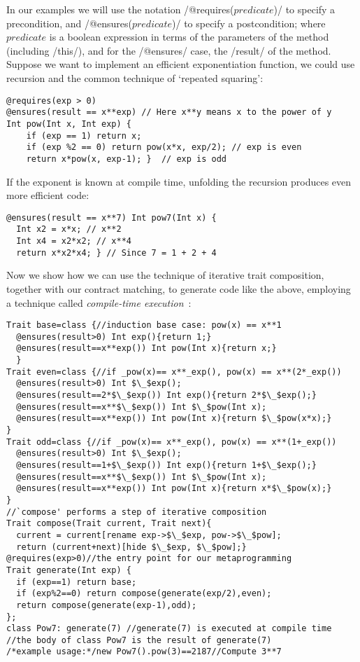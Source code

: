 In our examples we will use the notation /@requires($predicate$)/ 
to specify a precondition, and /@ensures($predicate$)/ 
to specify a postcondition; where $predicate$ is a boolean expression
in terms of the parameters of the method (including /this/), and for the /@ensures/ case, the /result/ of the method.
Suppose we want to implement an efficient exponentiation function, we could use recursion and the common technique of `repeated squaring':
\vspace{-1ex}
\begin{lstlisting}
@requires(exp > 0)
@ensures(result == x**exp) // Here x**y means x to the power of y
Int pow(Int x, Int exp) {
	if (exp == 1) return x;
	if (exp %2 == 0) return pow(x*x, exp/2); // exp is even
	return x*pow(x, exp-1); }  // exp is odd
\end{lstlisting}
If the exponent is known at compile time,
unfolding the recursion produces even more efficient code:
\vspace{-1ex}
\begin{lstlisting}[firstnumber=7]
@ensures(result == x**7) Int pow7(Int x) { 
  Int x2 = x*x; // x**2
  Int x4 = x2*x2; // x**4
  return x*x2*x4; } // Since 7 = 1 + 2 + 4
\end{lstlisting}
\vspace{-1ex}
Now we show how we can use the technique of iterative trait composition, together with our contract matching, to generate code like the above, employing a technique called \emph{compile-time execution}~\cite{sheard2002template}:
\vspace{-1ex}
\begin{lstlisting}[firstnumber=11]
Trait base=class {//induction base case: pow(x) == x**1
  @ensures(result>0) Int exp(){return 1;}  
  @ensures(result==x**exp()) Int pow(Int x){return x;}
  }
Trait even=class {//if _pow(x)== x**_exp(), pow(x) == x**(2*_exp())
  @ensures(result>0) Int $\_$exp();
  @ensures(result==2*$\_$exp()) Int exp(){return 2*$\_$exp();}
  @ensures(result==x**$\_$exp()) Int $\_$pow(Int x);
  @ensures(result==x**exp()) Int pow(Int x){return $\_$pow(x*x);}
}
Trait odd=class {//if _pow(x)== x**_exp(), pow(x) == x**(1+_exp())
  @ensures(result>0) Int $\_$exp();
  @ensures(result==1+$\_$exp()) Int exp(){return 1+$\_$exp();}
  @ensures(result==x**$\_$exp()) Int $\_$pow(Int x);
  @ensures(result==x**exp()) Int pow(Int x){return x*$\_$pow(x);}
}
//`compose' performs a step of iterative composition
Trait compose(Trait current, Trait next){
  current = current[rename exp->$\_$exp, pow->$\_$pow];
  return (current+next)[hide $\_$exp, $\_$pow];}
@requires(exp>0)//the entry point for our metaprogramming
Trait generate(Int exp) {
  if (exp==1) return base;
  if (exp%2==0) return compose(generate(exp/2),even);
  return compose(generate(exp-1),odd);
};
class Pow7: generate(7) //generate(7) is executed at compile time
//the body of class Pow7 is the result of generate(7)
/*example usage:*/new Pow7().pow(3)==2187//Compute 3**7
\end{lstlisting}
\vspace{-1ex}